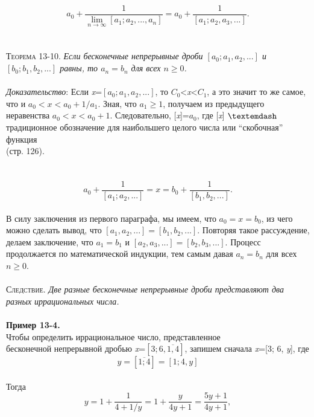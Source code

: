 \documentclass[a4paper,12pt]{article}
\renewcommand{\headrulewidth}{0pt}
\begin{document}
	$$a_0+\frac{1}{\lim_{n\to\infty} [ a_1; a_2, ..., a_n]}=a_0+\frac{1}{[a_1; a_2, a_3, ...]}.$$
	\newpage
	\renewcommand{\headrulewidth}{0pt}
	\rhead{\textbf{\thepage}}
	\setcounter{page}{317}
	\\\\
	\textsc{Теорема 13-10.} \textit{Если бесконечные непрерывные дроби $[a_0; a_1, a_2, ...]$ и $[b_0; b_1, b_2, ...]$ равны, то $a_n=b_n$ для всех $n\geq0$.}\\\\
	\textit{Доказательство}: Если \textit{x}=$[a_0; a_1, a_2, ...]$, то $C_0$<\textit{x}<$C_1$, а это значит то же самое, что и $a_0<\textit{x}<a_0+1/a_1$. Зная, что $a_1\geq1$, получаем из предыдущего неравенства $a_0<\textit{x}<a_0+1$. Следовательно, [\textit{x}]=$a_0$, где [\textit{x}] $\textemdash$ традиционное обозначение для наибольшего целого числа или ``скобочная'' функция\\
	(стр. 126).\\\\
	\\
	$$a_0+\frac{1}{[a_1; a_2, ...]}=\textit{x}=b_0+\frac{1}{[b_1, b_2, ...]}.$$\\
	В силу заключения из первого параграфа, мы имеем, что $a_0=\textit{x}=b_0$, из чего можно сделать вывод, что $[a_1, a_2, ...]=[b_1, b_2, ...].$ Повторяя такое рассуждение, \\
	делаем заключение, что $a_1=b_1$ и $[a_2, a_3, ...]=[b_2, b_3, ...]$. Процесс\\
	продолжается по математической индукции, тем самым давая $a_n=b_n$ для всех $n\geq0$.\\\\
	\textsc{Следствие.} \textit{Две разные бесконечные непрерывные дроби представляют два разных иррациональных числа.}\\\\
	\textbf{Пример 13-4.}\\
	Чтобы определить иррациональное число, представленное\\
	бесконечной непрерывной дробью \textit{x}=$[3; 6, \overline{1, 4}]$, запишем сначала \textit{x}=[3; 6, \textit{y}], где\\
	$$\textit{y}=[\overline{1; 4}]=[1; 4, \textit{y}]$$\\
	Тогда\\ $$\textit{y}=1+\frac{1}{4+1/\textit{y}}=1+\frac{\textit{y}}{4\textit{y}+1}=\frac{5\textit{y}+1}{4y+1},$$\\
\end{document}
